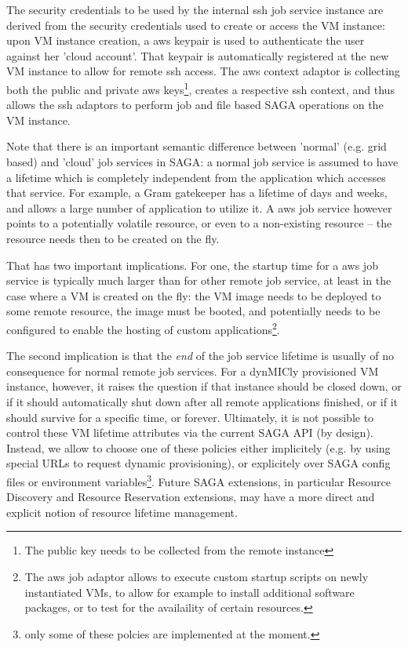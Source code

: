 \documentclass[conference,final]{IEEEtran}
\newcommand{\I}[1]{\textit{#1}}
\begin{document}
  The security credentials to be used by the internal ssh job service
  instance are derived from the security credentials used to create or
  access the VM instance: upon VM instance creation, a aws keypair is
  used to authenticate the user against her 'cloud account'.  That
  keypair is automatically registered at the new VM instance to allow
  for remote ssh access.  The aws context adaptor is collecting both
  the public and private aws keys\footnote{The public key needs to be
  collected from the remote instance}, creates a respective ssh context,
  and thus allows the ssh adaptors to perform job and file based SAGA
  operations on the VM instance.

  Note that there is an important semantic difference between 'normal'
  (e.g. grid based) and 'cloud' job services in SAGA: a normal job
  service is assumed to have a lifetime which is completely
  independent from the application which accesses that service.  For
  example, a Gram gatekeeper has a lifetime of days and weeks, and
  allows a large number of application to utilize it.  A aws job
  service however points to a potentially  volatile resource, or even
  to a non-existing resource -- the resource needs then to be created
  on the fly.

  That has two important implications.  For one, the startup time for
  a aws job service is typically much larger than for other remote job
  service, at least in the case where a VM is created on the fly: the
  VM image needs to be deployed to some remote resource, the image
  must be booted, and potentially needs to be configured to enable the
  hosting of custom applications\footnote{The aws job adaptor allows
  to execute custom startup scripts on newly instantiated VMs, to
  allow for example to install additional software packages, or to
  test for the availaility of certain resources.}.

  The second implication is that the \I{end} of the job service
  lifetime is usually of no consequence for normal remote job
  services.  For a dynMICly provisioned VM instance, however, it
  raises the question if that instance should be closed down, or if it
  should automatically shut down after all remote applications
  finished, or if it should  survive for a specific time, or forever.
  Ultimately, it is not possible to control these VM lifetime
  attributes via the current SAGA API (by design).  Instead, we
  allow to choose one of these policies either implicitely (e.g. by
  using special URLs to request dynamic provisioning), or explicitely
  over SAGA config files or environment variables\footnote{only some
  of these polcies are implemented at the moment.}.  Future SAGA
  extensions, in particular Resource Discovery and Resource
  Reservation extensions, may have a more direct and explicit notion
  of resource lifetime management.
\end{document}
